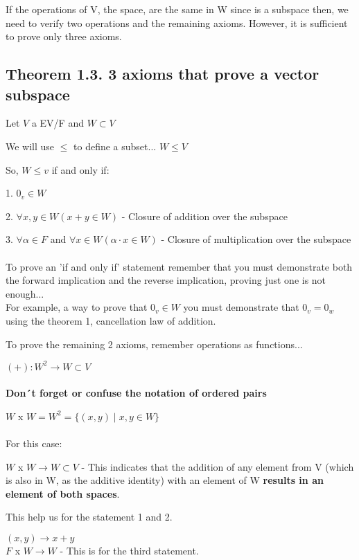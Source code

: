 \documentclass{article}
\begin{document}
If the operations of V, the space, are the same in W since is a subspace then, we need to verify two operations and the remaining axioms. However, it is sufficient to prove only three axioms.

\subsection*{Theorem 1.3. 3 axioms that prove a vector subspace}

Let \(V\) a EV/F and \(W \subset V\)

We will use \(\leq\) to define a subset... \(W\leq V\)

So, \(W \leq v \) if and only if:

1. \(0_v \in W\)

2. \(\forall x,y \in W ( x+ y \in W)\) - Closure of addition over the subspace

3. \(\forall \alpha \in F\) and \(\forall x \in W (\alpha \cdot x \in W)\) - Closure of multiplication over the subspace
\\
\\
To prove an 'if and only if' statement remember that you must demonstrate both the forward implication and the reverse implication, proving just one is not enough...
\\

For example, a way to prove that \(0_v \in W\) you must demonstrate that \(0_v = 0_w\) using the theorem 1, cancellation law of addition.

To prove the remaining 2 axioms, remember operations as functions...

\((+) : W^2 \rightarrow W \subset V\)
\\
\\
\textbf{Don´t forget or confuse the notation of ordered pairs}

\(W\) x \(W = W^2 = \{ (x,y)\;|\; x, y \in W\}\)
\\
\\
For this case:

\(W\) x \(W \rightarrow W \subset V\) - This indicates that the addition of any element from V (which is also in W, as the additive identity) with an element of W \textbf{results in an element of both spaces}.

This help us for the statement 1 and 2.

\((x,y) \rightarrow x+y\)
\\

\(F\) x \(W \rightarrow W\) - This is for the third statement.
\end{document}
